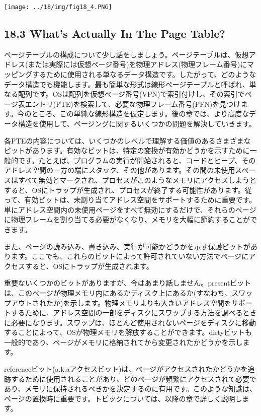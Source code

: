 \texttt{[image: ../18/img/fig18\_4.PNG]}

\hypertarget{whats-actually-in-the-page-table}{%
\subsection*{18.3 What's Actually In The Page
Table?}\label{whats-actually-in-the-page-table}}

ページテーブルの構成について少し話をしましょう。ページテーブルは、仮想アドレス(または実際には仮想ページ番号)を物理アドレス(物理フレーム番号)にマッピングするために使用される単なるデータ構造です。したがって、どのようなデータ構造でも機能します。最も簡単な形式は線形ページテーブルと呼ばれ、単なる配列です。OSは配列を仮想ページ番号(VPN)で索引付けし、その索引でページ表エントリ(PTE)を検索して、必要な物理フレーム番号(PFN)を見つけます。今のところ、この単純な線形構造を仮定します。後の章では、より高度なデータ構造を使用して、ページングに関するいくつかの問題を解決していきます。

各PTEの内容については、いくつかのレベルで理解する価値のあるさまざまなビットがあります。有効なビットは、特定の変換が有効かどうかを示すために一般的です。たとえば、プログラムの実行が開始されると、コードとヒープ、そのアドレス空間の一方の端にスタック、その他があります。その間の未使用スペースはすべて無効とマークされ、プロセスがこのようなメモリにアクセスしようとすると、OSにトラップが生成され、プロセスが終了する可能性があります。従って、有効ビットは、未割り当てアドレス空間をサポートするために重要です。単にアドレス空間内の未使用ページをすべて無効にするだけで、それらのページに物理フレームを割り当てる必要がなくなり、メモリを大幅に節約することができます。

また、ページの読み込み、書き込み、実行が可能かどうかを示す保護ビットがあります。ここでも、これらのビットによって許可されていない方法でページにアクセスすると、OSにトラップが生成されます。

重要ないくつかのビットがありますが、今はあまり話しません。presentビットは、このページが物理メモリ内にあるかディスク上にあるか(すなわち、スワップアウトされたか)を示します。物理メモリよりも大きいアドレス空間をサポートするために、アドレス空間の一部をディスクにスワップする方法を調べるときに必要になります。スワップは、ほとんど使用されないページをディスクに移動することによって、OSが物理メモリを解放することができます。dirtyビットも一般的であり、ページがメモリに格納されてから変更されたかどうかを示します。

referenceビット(a.k.aアクセスビット)は、ページがアクセスされたかどうかを追跡するために使用されることがあり、どのページが頻繁にアクセスされて必要であり、メモリに保持されるべきかを決定するのに有用です。このような知識は、ページの置換時に重要です。トピックについては、以降の章で詳しく説明します。


